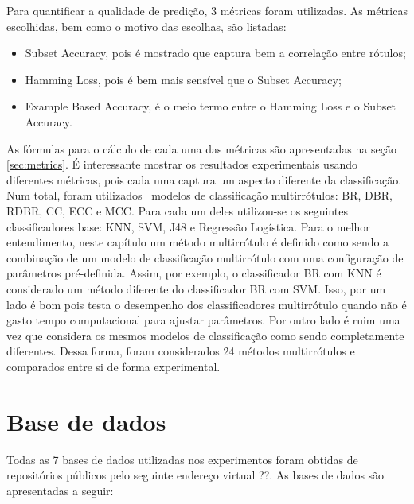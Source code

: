 Para quantificar a qualidade de predição, 3 métricas foram utilizadas. As métricas escolhidas, bem como o motivo das escolhas,
são listadas:
\begin{itemize}
 \item Subset Accuracy, pois é mostrado que captura bem a correlação entre rótulos;
 \item Hamming Loss, pois é bem mais sensível que o Subset Accuracy;
 \item Example Based Accuracy, é o meio termo entre o Hamming Loss e o Subset Accuracy.
\end{itemize}

As fórmulas para o cálculo de cada uma das métricas são apresentadas na seção \ref{sec:metrics}.
É interessante mostrar os resultados experimentais usando diferentes métricas, pois cada uma captura
um aspecto diferente da classificação. 
Num total, foram utilizados \Nml~modelos de classificação multirrótulos: BR, DBR, RDBR, CC, ECC e MCC.
Para cada um deles utilizou-se os seguintes classificadores base: KNN, SVM, J48 e Regressão Logística. 
Para o melhor entendimento, neste capítulo um método multirrótulo é definido como sendo a combinação
de um modelo de classificação multirrótulo com uma configuração de parâmetros pré-definida. Assim, por exemplo,
o classificador BR com KNN é considerado um método diferente do classificador BR com SVM. Isso, por um lado é bom
pois testa o desempenho dos classificadores multirrótulo quando não é gasto tempo computacional para ajustar parâmetros.
Por outro lado é ruim uma vez que considera os mesmos modelos de classificação como sendo completamente diferentes.
Dessa forma, foram considerados 24 métodos multirrótulos e comparados entre si de forma experimental.

\section{Base de dados}
\label{sec:datas}
Todas as 7 bases de dados utilizadas nos experimentos foram obtidas de repositórios públicos pelo seguinte endereço virtual ??.
As bases de dados são apresentadas a seguir:

